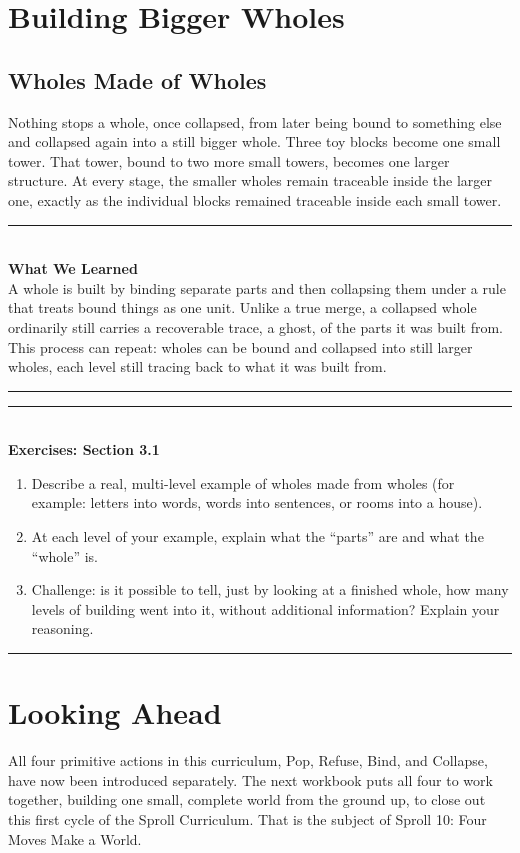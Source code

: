 \documentclass[11pt]{book}
\newenvironment{exercisebox}[1]{\vspace{0.8em}\noindent\rule{\linewidth}{0.6pt}\\[0.2em]\textbf{Exercises: #1}\\[0.3em]\begin{enumerate}[label=\arabic*., itemsep=0.4em]}{\end{enumerate}\noindent\rule{\linewidth}{0.6pt}\vspace{0.6em}}
\newenvironment{summarybox}{\vspace{0.6em}\noindent\rule{\linewidth}{0.6pt}\\[0.2em]\textbf{What We Learned}\\[0.3em]}{\\[0.2em]\noindent\rule{\linewidth}{0.6pt}\vspace{0.6em}}
\begin{document}
\chapter{Building Bigger Wholes}

\section{Wholes Made of Wholes}

Nothing stops a whole, once collapsed, from later being bound to something else and collapsed again into a still bigger whole. Three toy blocks become one small tower. That tower, bound to two more small towers, becomes one larger structure. At every stage, the smaller wholes remain traceable inside the larger one, exactly as the individual blocks remained traceable inside each small tower.

\begin{summarybox}
A whole is built by binding separate parts and then collapsing them under a rule that treats bound things as one unit. Unlike a true merge, a collapsed whole ordinarily still carries a recoverable trace, a ghost, of the parts it was built from. This process can repeat: wholes can be bound and collapsed into still larger wholes, each level still tracing back to what it was built from.
\end{summarybox}

\begin{exercisebox}{Section 3.1}
\item Describe a real, multi-level example of wholes made from wholes (for example: letters into words, words into sentences, or rooms into a house).
\item At each level of your example, explain what the ``parts'' are and what the ``whole'' is.
\item Challenge: is it possible to tell, just by looking at a finished whole, how many levels of building went into it, without additional information? Explain your reasoning.
\end{exercisebox}

\chapter*{Looking Ahead}

All four primitive actions in this curriculum, Pop, Refuse, Bind, and Collapse, have now been introduced separately. The next workbook puts all four to work together, building one small, complete world from the ground up, to close out this first cycle of the Sproll Curriculum. That is the subject of Sproll 10: Four Moves Make a World.
\end{document}
